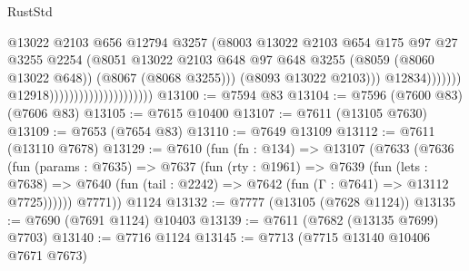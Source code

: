 \begin{lexlean}{RustStd}
\begin{coremodule}
                                                              @13022
                                                              @2103
                                                              @656
                                                              @12794
                                                              @3257
                                                              (@8003
                                                                @13022
                                                                @2103
                                                                @654
                                                                @175
                                                                @97
                                                                @27
                                                                @3255
                                                                @2254
                                                                (@8051
                                                                  @13022
                                                                  @2103
                                                                  @648
                                                                  @97
                                                                  @648
                                                                  @3255
                                                                  (@8059 (@8060 @13022 @648))
                                                                  (@8067 (@8068 @3255)))
                                                                (@8093 @13022 @2103)))
                                                            @12834)))))))
                                              @12918)))))))))))))))))))))
@13100 := @7594 @83
@13104 := @7596 (@7600 @83) (@7606 @83)
@13105 := @7615 @10400
@13107 := @7611 (@13105 @7630)
@13109 := @7653 (@7654 @83)
@13110 := @7649 @13109
@13112 := @7611 (@13110 @7678)
@13129 := @7610
    (fun (fn : @134) =>
    @13107
      (@7633
        (@7636
          (fun (params : @7635) =>
          @7637
            (fun (rty : @1961) =>
            @7639
              (fun (lets : @7638) =>
              @7640 (fun (tail : @2242) => @7642 (fun (Γ : @7641) => @13112 @7725))))))
        @7771))
    @1124
@13132 := @7777 (@13105 (@7628 @1124))
@13135 := @7690 (@7691 @1124) @10403
@13139 := @7611 (@7682 (@13135 @7699) @7703)
@13140 := @7716 @1124
@13145 := @7713 (@7715 @13140 @10406 @7671 @7673)

\end{coremodule}
\end{lexlean}
